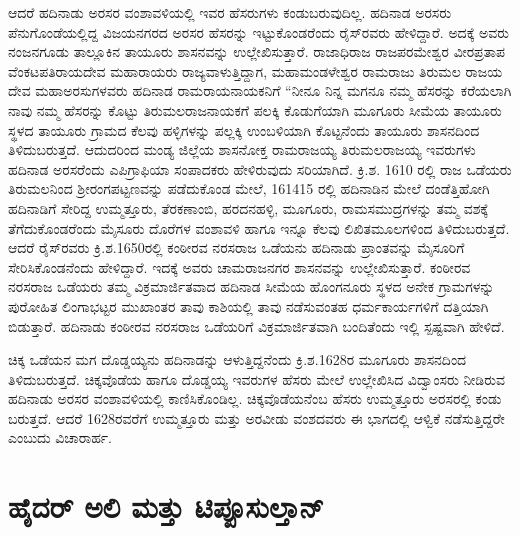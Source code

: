 ಆದರೆ ಹದಿನಾಡು ಅರಸರ ವಂಶಾವಳಿಯಲ್ಲಿ ಇವರ ಹೆಸರುಗಳು ಕಂಡುಬರುವುದಿಲ್ಲ. ಹದಿನಾಡ ಅರಸರು ಪೆನುಗೊಂಡೆಯಲ್ಲಿದ್ದ ವಿಜಯನಗರದ ಅರಸರ ಹೆಸರನ್ನು ಇಟ್ಟುಕೊಂಡರೆಂದು ರೈಸ್​ರವರು ಹೇಳಿದ್ದಾರೆ. ಅದಕ್ಕೆ ಅವರು ನಂಜನಗೂಡು ತಾಲ್ಲೂಕಿನ ತಾಯೂರು ಶಾಸನವನ್ನು ಉಲ್ಲೇಖಿಸುತ್ತಾರೆ. ರಾಜಾಧಿರಾಜ ರಾಜಪರಮೇಶ್ವರ ವೀರಪ್ರತಾಪ ವೆಂಕಟಪತಿರಾಯದೇವ ಮಹಾರಾಯರು ರಾಜ್ಯವಾಳುತ್ತಿದ್ದಾಗ, ಮಹಾಮಂಡಳೇಶ್ವರ ರಾಮರಾಜು ತಿರುಮಲ ರಾಜಯ ದೇವ ಮಹಾಅರಸುಗಳವರು ಹದಿನಾಡ ರಾಮರಾಯನಾಯಕನಿಗೆ “ನೀನೂ ನಿನ್ನ ಮಗನೂ ನಮ್ಮ ಹೆಸರನ್ನು ಕರೆಯಲಾಗಿ ನಾವು ನಮ್ಮ ಹೆಸರನ್ನು ಕೊಟ್ಟು ತಿರುಮಲರಾಜನಾಯಕಗೆ ಪಲಕ್ಕಿ ಕೊಡುಗೆಯಾಗಿ ಮೂಗೂರು ಸೀಮೆಯ ತಾಯೂರು ಸ್ಥಳದ ತಾಯೂರು ಗ್ರಾಮದ ಕೆಲವು ಹಳ್ಳಿಗಳನ್ನು ಪಲ್ಲಕ್ಕಿ ಉಂಬಳಿಯಾಗಿ ಕೊಟ್ಟನೆಂದು ತಾಯೂರು ಶಾಸನದಿಂದ ತಿಳಿದುಬರುತ್ತದೆ. ಆದುದರಿಂದ ಮಂಡ್ಯ ಜಿಲ್ಲೆಯ ಶಾಸನೋಕ್ತ ರಾಮರಾಜಯ್ಯ ತಿರುಮಲರಾಜಯ್ಯ ಇವರುಗಳು ಹದಿನಾಡ ಅರಸರೆಂದು ಎಪಿಗ್ರಾಫಿಯಾ ಸಂಪಾದಕರು ಹೇಳಿರುವುದು ಸರಿಯಾಗಿದೆ. ಕ್ರಿ.ಶ. 1610 ರಲ್ಲಿ ರಾಜ ಒಡೆಯರು ತಿರುಮಲನಿಂದ ಶ‍್ರೀರಂಗಪಟ್ಟಣವನ್ನು ಪಡೆದುಕೊಂಡ ಮೇಲೆ, 161415 ರಲ್ಲಿ ಹದಿನಾಡಿನ ಮೇಲೆ ದಂಡೆತ್ತಿಹೋಗಿ ಹದಿನಾಡಿಗೆ ಸೇರಿದ್ದ ಉಮ್ಮತ್ತೂರು, ತೆರಕಣಾಂಬಿ, ಹರದನಹಳ್ಳಿ, ಮೂಗೂರು, ರಾಮಸಮುದ್ರಗಳನ್ನು ತಮ್ಮ ವಶಕ್ಕೆ ತೆಗೆದುಕೊಂಡರೆಂದು ಮೈಸೂರು ದೊರೆಗಳ ವಂಶಾವಳಿ ಹಾಗೂ ಇನ್ನೂ ಕೆಲವು ಲಿಖಿತಮೂಲಗಳಿಂದ ತಿಳಿದುಬರುತ್ತದೆ. ಆದರೆ ರೈಸ್​ರವರು ಕ್ರಿ.ಶ.1650ರಲ್ಲಿ ಕಂಠೀರವ ನರಸರಾಜ ಒಡೆಯನು ಹದಿನಾಡು ಪ್ರಾಂತವನ್ನು ಮೈಸೂರಿಗೆ ಸೇರಿಸಿಕೊಂಡನೆಂದು ಹೇಳಿದ್ದಾರೆ. ಇದಕ್ಕೆ ಅವರು ಚಾಮರಾಜನಗರ ಶಾಸನವನ್ನು ಉಲ್ಲೇಖಿಸುತ್ತಾರೆ. ಕಂಠೀರವ ನರಸರಾಜ ಒಡೆಯರು ತಮ್ಮ ವಿಕ್ರಮಾರ್ಜಿತವಾದ ಹದಿನಾಡ ಸೀಮೆಯ ಹೊಂಗನೂರು ಸ್ಥಳದ ಅನೇಕ ಗ್ರಾಮಗಳನ್ನು ಪುರೋಹಿತ ಲಿಂಗಾಭಟ್ಟರ ಮುಖಾಂತರ ತಾವು ಕಾಶಿಯಲ್ಲಿ ತಾವು ನಡೆಸುವಂತಹ ಧರ್ಮಕಾರ್ಯಗಳಿಗೆ ದತ್ತಿಯಾಗಿ ಬಿಡುತ್ತಾರೆ. ಹದಿನಾಡು ಕಂಠೀರವ ನರಸರಾಜ ಒಡೆಯರಿಗೆ ವಿಕ್ರಮಾರ್ಜಿತವಾಗಿ ಬಂದಿತೆಂದು ಇಲ್ಲಿ ಸ್ಪಷ್ಟವಾಗಿ ಹೇಳಿದೆ.

ಚಿಕ್ಕ ಒಡೆಯನ ಮಗ ದೊಡ್ಡಯ್ಯನು ಹದಿನಾಡನ್ನು ಆಳುತ್ತಿದ್ದನೆಂದು ಕ್ರಿ.ಶ.1628ರ ಮೂಗೂರು ಶಾಸನದಿಂದ ತಿಳಿದುಬರುತ್ತದೆ. ಚಿಕ್ಕವೊಡೆಯ ಹಾಗೂ ದೊಡ್ಡಯ್ಯ ಇವರುಗಳ ಹೆಸರು ಮೇಲೆ ಉಲ್ಲೇಖಿಸಿದ ವಿದ್ವಾಂಸರು ನೀಡಿರುವ ಹದಿನಾಡು ಅರಸರ ವಂಶಾವಳಿಯಲ್ಲಿ ಕಾಣಿಸಿಕೊಂಡಿಲ್ಲ. ಚಿಕ್ಕವೊಡೆಯನೆಂಬ ಹೆಸರು ಉಮ್ಮತ್ತೂರು ಅರಸರಲ್ಲಿ ಕಂಡು ಬರುತ್ತದೆ. ಆದರೆ 1628ರವರೆಗೆ ಉಮ್ಮತ್ತೂರು ಮತ್ತು ಅರವೀಡು ವಂಶದವರು ಈ ಭಾಗದಲ್ಲಿ ಆಳ್ವಿಕೆ ನಡೆಸುತ್ತಿದ್ದರೇ ಎಂಬುದು ವಿಚಾರಾರ್ಹ.


\section{ಹೈದರ್​ ಅಲಿ ಮತ್ತು ಟಿಪ್ಪೂಸುಲ್ತಾನ್​}

